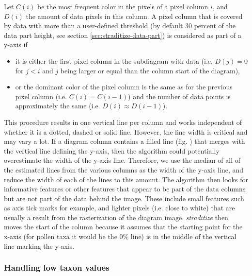 \begin{refsection}
Let $C(i)$ be the most frequent color in the pixels of a pixel column $i$, and $D(i)$ the amount of data pixels in this column. A pixel column that is covered by data with more than a user-defined threshold (by default 30 percent of the data part height, see section \ref{sec:straditize-data-part}) is considered as part of a y-axis if 
\begin{itemize}
	\item it is either the first pixel column in the subdiagram with data (i.e. $D(j) = 0$ for $j < i$ and $j$ being larger or equal than the column start of the diagram),
	\item or the dominant color of the pixel column is the same as for the previous pixel column (i.e. $C(i) = C(i-1)$) and the number of data points is approximately the same (i.e. $D(i) \approx  D(i-1)$).
\end{itemize}

This procedure results in one vertical line per column and works independent of whether it is a dotted, dashed or solid line. However, the line width is critical and may vary a lot. If a diagram column contains a filled line (fig. \samplediagram[h]) that merges with the vertical line defining the y-axis, then the algorithm could potentially overestimate the width of the y-axis line. Therefore, we use the median of all of the estimated lines from the various columns as the width of the y-axis line, and reduce the width of each of the lines to this amount.
The algorithm then looks for informative features or other features that appear to be part of the data columns but are not part of the data behind the image. These include small features such as axis tick marks for example, and lighter pixels (i.e. close to white) that are usually a result from the rasterization of the diagram image.
\emph{straditize} then moves the start of the column because it assumes that the starting point for the x-axis (for pollen taxa it would be the 0\% line) is in the middle of the vertical line marking the y-axis.


\subsubsection{Handling low taxon values}  \label{sec:straditize-occurences}


\end{refsection}
